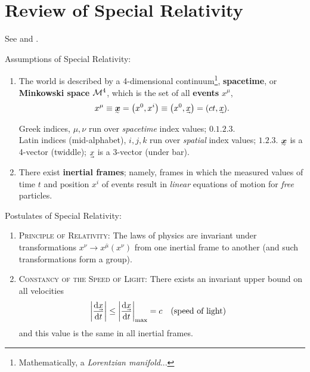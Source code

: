 \chapter[Review of Special Relativity]{Review of Special Relativity}

\begin{note}[Background]
See \cite[ch~1]{schutz2009first} and \cite[ch 5, 12, 13]{doughty2018lagrangian}.
\end{note}

\noindent
Assumptions of Special Relativity:
\begin{enumerate}
	\item The world is described by a 4-dimensional continuum\footnote{Mathematically, a \emph{Lorentzian manifold}...}, \textbf{spacetime}, or \textbf{Minkowski space} $\mathcal M^4$, which is the set of all \textbf{events} $x^\mu$,
	\begin{align}
		x^\mu \equiv \ts x = \qty(x^0, x^i) \equiv \qty(x^0, \uvec x) = \qty(ct, \uvec x)
	.\end{align}
	\begin{note}[Notation]
	Greek indices, $\mu,\nu$ run over \textit{spacetime} index values; $\qty{0,1,2,3}$. \\
	Latin indices (mid-alphabet), $i,j,k$ run over \textit{spatial} index values; $\qty{1,2,3}$.
	$\ts x$ is a 4-vector (twiddle); $\uvec x$ is a 3-vector (under bar).
	\end{note}
	
	\item There exist \textbf{inertial frames}; namely, frames in which the measured values of time $t$ and position $x^i$ of events result in \textit{linear} equations of motion for \textit{free} particles.
\end{enumerate}


\noindent
Postulates of Special Relativity:
\begin{enumerate}
	\item \textsc{Principle of Relativity:}
	The laws of physics are invariant under transformations $x^\nu \to x^{\bar\mu}(x^\nu)$ from one inertial frame to another (and such transformations form a group).
	
	\item \textsc{Constancy of the Speed of Light:} There exists an invariant upper bound on all velocities
	\begin{align}
		\qty|\dv{\uvec x}{t}| \le \qty|\dv{\uvec x}{t}|_\text{max} = c
		\qqtext{(speed of light)}
	\end{align}
	and this value is the same in all inertial frames.
\end{enumerate}
	
